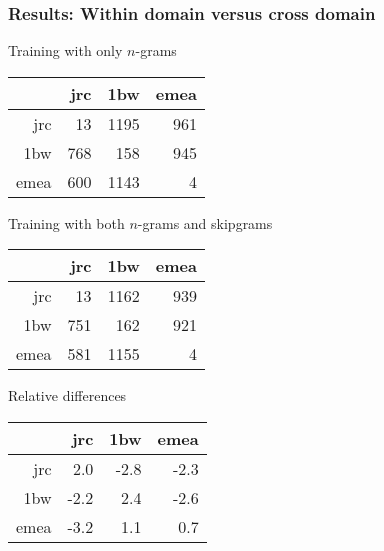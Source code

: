 \documentclass{beamer}
\begin{document}
\begin{frame}
    \frametitle{Results: Within domain versus cross domain}

    {\small
        \begin{block}{Training with only $n$-grams}
            \begin{tabular}{rrrr}
                    & jrc & 1bw  & emea \\ \hline
                jrc & 13  & 1195 & 961 \\
                1bw & 768 & 158  & 945 \\
                emea& 600 & 1143 & 4
            \end{tabular}
        \end{block}

        \begin{block}{Training with both $n$-grams and skipgrams}
            \begin{tabular}{rrrr}
                    & jrc & 1bw  & emea \\ \hline
                jrc & 13  & 1162 & 939 \\
                1bw & 751 & 162  & 921 \\
                emea& 581 & 1155 & 4
            \end{tabular}
        \end{block}

        \begin{block}{Relative differences}
            \begin{tabular}{rrrr}
                    & jrc  & 1bw  & emea \\ \hline
                jrc & 2.0  & -2.8 & -2.3 \\
                1bw & -2.2 & 2.4  & -2.6 \\
                emea& -3.2 & 1.1  & 0.7
            \end{tabular}
        \end{block}
    }
\end{frame}
\end{document}
